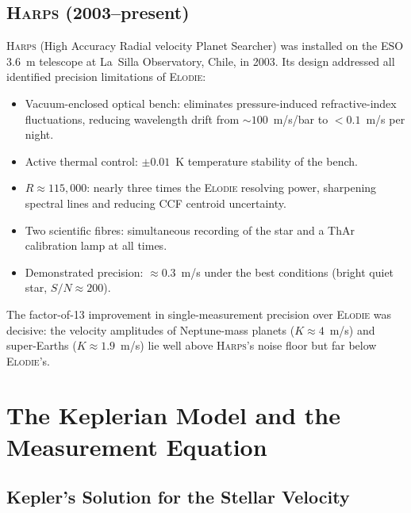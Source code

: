 \documentclass[12pt]{article}
\begin{document}
\subsection{\textsc{Harps} (2003--present)}

\textsc{Harps} \citep{Mayor2003} (High Accuracy Radial velocity Planet
Searcher) was installed on the ESO 3.6~m telescope at La~Silla
Observatory, Chile, in 2003.  Its design addressed all identified
precision limitations of \textsc{Elodie}:
\begin{itemize}
  \item Vacuum-enclosed optical bench: eliminates pressure-induced
    refractive-index fluctuations, reducing wavelength drift from
    $\sim 100$~m/s/bar to $< 0.1$~m/s per night.
  \item Active thermal control: $\pm 0.01$~K temperature stability
    of the bench.
  \item $R \approx 115{,}000$: nearly three times the \textsc{Elodie}
    resolving power, sharpening spectral lines and reducing
    CCF centroid uncertainty.
  \item Two scientific fibres: simultaneous recording of the star
    and a ThAr calibration lamp at all times.
  \item Demonstrated precision: $\approx 0.3$~m/s under the best
    conditions (bright quiet star, $S/N \approx 200$).
\end{itemize}
The factor-of-13 improvement in single-measurement precision over
\textsc{Elodie} was decisive: the velocity amplitudes of
Neptune-mass planets ($K \approx 4$~m/s) and super-Earths
($K \approx 1.9$~m/s) lie well above \textsc{Harps}'s noise floor
but far below \textsc{Elodie}'s.

\section{The Keplerian Model and the Measurement Equation}
\label{sec:kepler}

\subsection{Kepler's Solution for the Stellar Velocity}
\end{document}
